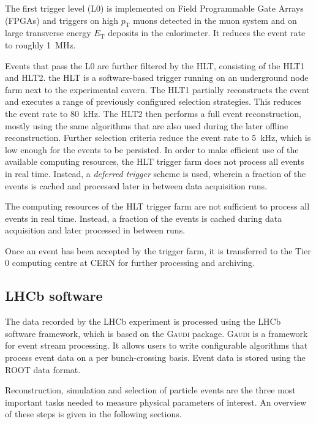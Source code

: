 The first trigger level (L0) is implemented on Field Programmable Gate Arrays (FPGAs) and triggers on high $p_\text{T}$ muons detected in the muon system and on large transverse energy $E_\text{T}$ deposits in the calorimeter.
It reduces the event rate to roughly \SI{1}{MHz}.

Events that pass the L0 are further filtered by the \gls{HLT}, consisting of the HLT1 and HLT2.
the \gls{HLT} is a software-based trigger running on an underground node farm next to the experimental cavern.
The HLT1 partially reconstructs the event and executes a range of previously configured selection strategies.
This reduces the event rate to \SI{80}{kHz}.
The HLT2 then performs a full event reconstruction, mostly using the same algorithms that are also used during the later offline reconstruction.
Further selection criteria reduce the event rate to \SI{5}{kHz}, which is low enough for the events to be persisted.  \cite{Trigger2011} \cite{Trigger2012}
In order to make efficient use of the available computing resources, the HLT trigger farm does not process all events in real time.
Instead, a \emph{deferred trigger} scheme is used, wherein a fraction of the events is cached and processed later in between data acquisition runs.

The computing resources of the HLT trigger farm are not sufficient to process all events in real time.
Instead, a fraction of the events is cached during data acquisition and later processed in between runs.

Once an event has been accepted by the trigger farm, it is transferred to the Tier 0 computing centre at \gls{CERN} for further processing and archiving.

\subsection{LHCb software}

The data recorded by the LHCb experiment is processed using the LHCb software framework, which is based on the \textsc{Gaudi} package.
\textsc{Gaudi} is a framework for event stream processing.
It allows users to write configurable algorithms that process event data on a per bunch-crossing basis.
Event data is stored using the \textsc{ROOT} \cite{ROOT} data format.

Reconstruction, simulation and selection of particle events are the three most important tasks needed to measure physical parameters of interest.
An overview of these steps is given in the following sections.

